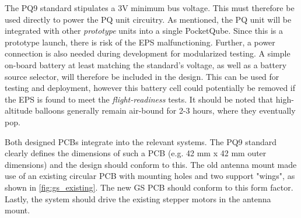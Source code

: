 The PQ9 standard stipulates a 3V minimum bus voltage. This must therefore be used directly to power the PQ unit circuitry. As mentioned, the PQ unit will be integrated with other \textit{prototype} units into a single PocketQube. Since this is a prototype launch, there is risk of the EPS malfunctioning. Further, a power connection is also needed during development for modularized testing. A simple on-board battery at least matching the standard's voltage, as well as a battery source selector, will therefore be included in the design. This can be used for testing and deployment, however this battery cell could potentially be removed if the EPS is found to meet the \textit{flight-readiness} tests. It should be noted that high-altitude balloons generally remain air-bound for 2-3 hours, where they eventually pop.

Both designed PCBs integrate into the relevant systems. The PQ9 standard clearly defines the dimensions of such a PCB (e.g. 42 mm x 42 mm outer dimensions) and the design should conform to this. The old antenna mount made use of an existing circular PCB with mounting holes and two support "wings", as shown in \ref{fig:gs_existing}. The new GS PCB should conform to this form factor. Lastly, the system should drive the existing stepper motors in the antenna mount.

